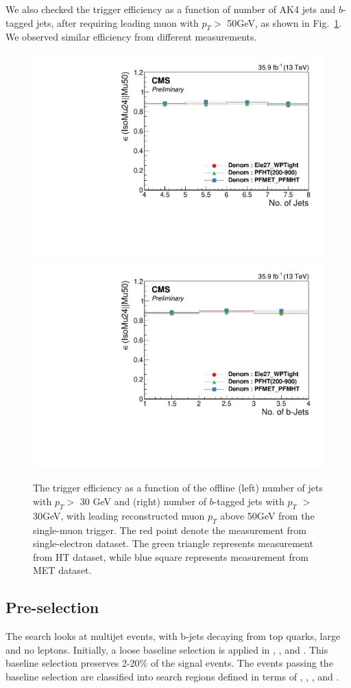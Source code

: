 We also checked the trigger efficiency as a function of number of AK4 jets and
$b$-tagged jets, after requiring leading muon with $p_{T}>$ 50GeV, as shown in
Fig.~\ref{fig:TrigMuonJets}. We observed similar efficiency from different
measurements.
\begin{figure}[tbp]
 \begin{center}
   \includegraphics[width=0.49\linewidth]{sections/mc4/EvtSelSBOpt/figures/MuonNJets.pdf}
   \includegraphics[width=0.49\linewidth]{sections/mc4/EvtSelSBOpt/figures/MuonNBs.pdf}
   \caption{ The trigger efficiency as a function of the offline (left) number
		 of jets with $p_{T}>$ 30 GeV and (right) number of $b$-tagged jets with $p_{T}$
		 $>$ 30GeV, with leading reconstructed muon $p_{T}$ above 50GeV from the
   single-muon trigger. The red point denote the measurement from
   single-electron dataset. The green triangle represents measurement from HT
   dataset, while blue square represents measurement from MET dataset.}
   \label{fig:TrigMuonJets}
 \end{center}
\end{figure}

\subsection{Pre-selection}
\label{sec:pre-selection}

The search looks at multijet events, with b-jets decaying from top quarks, 
large \MET and no leptons. Initially, a loose baseline selection is applied 
in \MET, \HT, \njets and \nbjets. %
This baseline selection preserves 2-20\% of the signal events. 
The events passing the baseline selection are classified into search regions
defined in terms of \ntops, \nbjets, \MET, \HT and \MTTwo.

